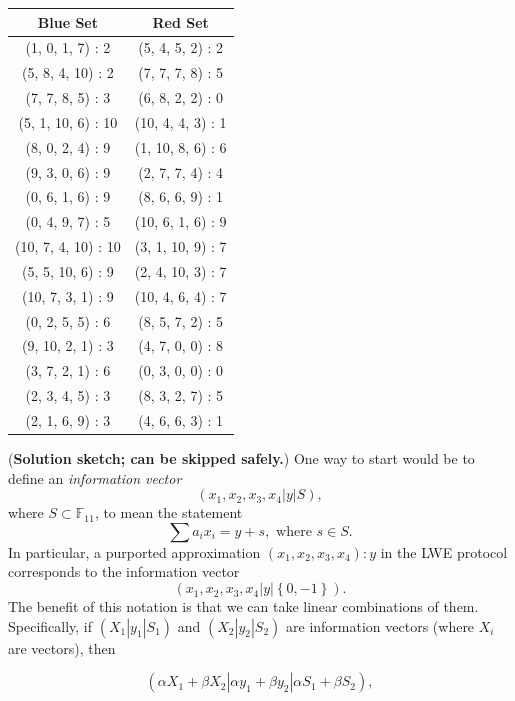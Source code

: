 \begin{center}
\begin{tabular}{|c|c|}
Blue Set & Red Set \\
\midrule\noalign{}
\endhead
\bottomrule\noalign{}
\endlastfoot
(1, 0, 1, 7) : 2 & (5, 4, 5, 2) : 2 \\
(5, 8, 4, 10) : 2 & (7, 7, 7, 8) : 5 \\
(7, 7, 8, 5) : 3 & (6, 8, 2, 2) : 0 \\
(5, 1, 10, 6) : 10 & (10, 4, 4, 3) : 1 \\
(8, 0, 2, 4) : 9 & (1, 10, 8, 6) : 6 \\
(9, 3, 0, 6) : 9 & (2, 7, 7, 4) : 4 \\
(0, 6, 1, 6) : 9 & (8, 6, 6, 9) : 1 \\
(0, 4, 9, 7) : 5 & (10, 6, 1, 6) : 9 \\
(10, 7, 4, 10) : 10 & (3, 1, 10, 9) : 7 \\
(5, 5, 10, 6) : 9 & (2, 4, 10, 3) : 7 \\
(10, 7, 3, 1) : 9 & (10, 4, 6, 4) : 7 \\
(0, 2, 5, 5) : 6 & (8, 5, 7, 2) : 5 \\
(9, 10, 2, 1) : 3 & (4, 7, 0, 0) : 8 \\
(3, 7, 2, 1) : 6 & (0, 3, 0, 0) : 0 \\
(2, 3, 4, 5) : 3 & (8, 3, 2, 7) : 5 \\
(2, 1, 6, 9) : 3 & (4, 6, 6, 3) : 1 \\
\end{tabular}
\end{center}

(\textbf{Solution sketch; can be skipped safely.}) One way to start
would be to define an \emph{information vector}
\[\left( x_{1},x_{2},x_{3},x_{4}|y|S \right),\] where
\(S \subset {\mathbb{F}}_{11}\), to mean the statement
\[\sum a_{i}x_{i} = y + s,\text{ where }s \in S.\] In particular, a
purported approximation \(\left( x_{1},x_{2},x_{3},x_{4} \right):y\) in
the LWE protocol corresponds to the information vector
\[\left( x_{1},x_{2},x_{3},x_{4}|y|\left\{ 0, - 1 \right\} \right).\]
The benefit of this notation is that we can take linear combinations of
them. Specifically, if \(\left( X_{1}\left| y_{1} \right|S_{1} \right)\)
and \(\left( X_{2}\left| y_{2} \right|S_{2} \right)\) are information
vectors (where \(X_{i}\) are vectors), then

\[\left( \alpha X_{1} + \beta X_{2}\left| \alpha y_{1} + \beta y_{2} \right|\alpha S_{1} + \beta S_{2} \right),\]

